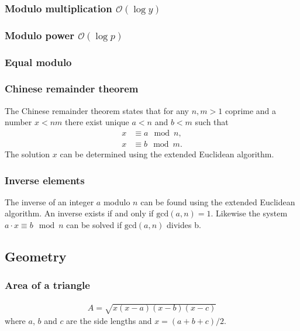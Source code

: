 \subsubsection{Modulo multiplication $\mathcal O(\log y)$}

\subsubsection{Modulo power $\mathcal O(\log p)$}

\subsubsection{Equal modulo}

\subsubsection{Chinese remainder theorem}
The Chinese remainder theorem states that for any $n, m > 1$ coprime and a number $x < nm$ there exist unique $a < n$ and $b < m$ such that
\begin{align*}
    x &\equiv a \mod n, \\
    x &\equiv b \mod m.
\end{align*}
The solution $x$ can be determined using the extended Euclidean algorithm.

\subsubsection{Inverse elements}
The inverse of an integer $a$ modulo $n$ can be found using the extended Euclidean algorithm. An inverse exists if and only if $\text{gcd}(a, n) = 1$. Likewise the system $a\cdot x \equiv b \mod n$ can be solved if $\text{gcd}(a, n)$ divides b.



\subsection{Geometry}

\subsubsection{Area of a triangle}
\begin{align*}
    A = \sqrt{x(x - a)(x - b)(x - c)}
\end{align*}
where $a$, $b$ and $c$ are the side lengths and $x = (a + b + c)/2$.

